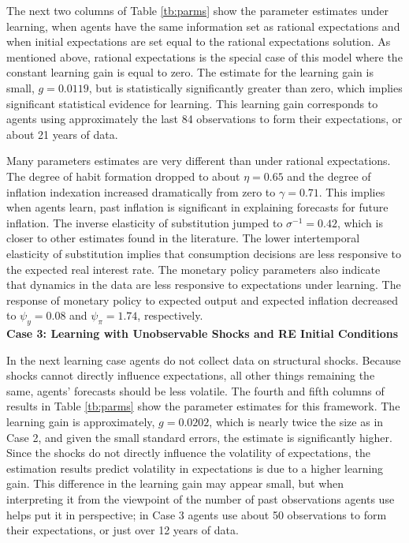 \documentclass[11pt]{article}
\begin{document}
The next two columns of Table \ref{tb:parms} show the parameter estimates under learning, when agents have the same information set as rational expectations and when initial expectations are set equal to the rational expectations solution.  As mentioned above, rational expectations is the special case of this model where the constant learning gain is equal to zero.  The estimate for the learning gain is small, $g=0.0119$, but is statistically significantly greater than zero, which implies significant statistical evidence for learning.  This learning gain corresponds to agents using approximately the last 84 observations to form their expectations, or about 21 years of data.  

Many parameters estimates are very different than under rational expectations.  The degree of habit formation dropped to about $\eta=0.65$ and the degree of inflation indexation increased dramatically from zero to $\gamma=0.71$.  This implies when agents learn, past inflation is significant in explaining forecasts for future inflation.  The inverse elasticity of substitution jumped to $\sigma^{-1} = 0.42$, which is closer to other estimates found in the literature.  The lower intertemporal elasticity of substitution implies that consumption decisions are less responsive to the expected real interest rate.  The monetary policy parameters also indicate that dynamics in the data are less responsive to expectations under learning.  The response of monetary policy to expected output and expected inflation decreased to $\psi_y=0.08$ and $\psi_{\pi}=1.74$, respectively. \\

\noindent \textbf{Case 3:  Learning with Unobservable Shocks and RE Initial Conditions}

In the next learning case agents do not collect data on structural shocks.  Because shocks cannot directly influence expectations, all other things remaining the same, agents' forecasts should be less volatile.  The fourth and fifth columns of results in Table \ref{tb:parms} show the parameter estimates for this framework.  The learning gain is approximately, $g=0.0202$, which is nearly twice the size as in Case 2, and given the small standard errors, the estimate is significantly higher.  Since the shocks do not directly influence the volatility of expectations, the estimation results predict volatility in expectations is due to a higher learning gain.  This difference in the learning gain may appear small, but when interpreting it from the viewpoint of the number of past observations agents use helps put it in perspective; in Case 3 agents use about 50 observations to form their expectations, or just over 12 years of data.
\end{document}

